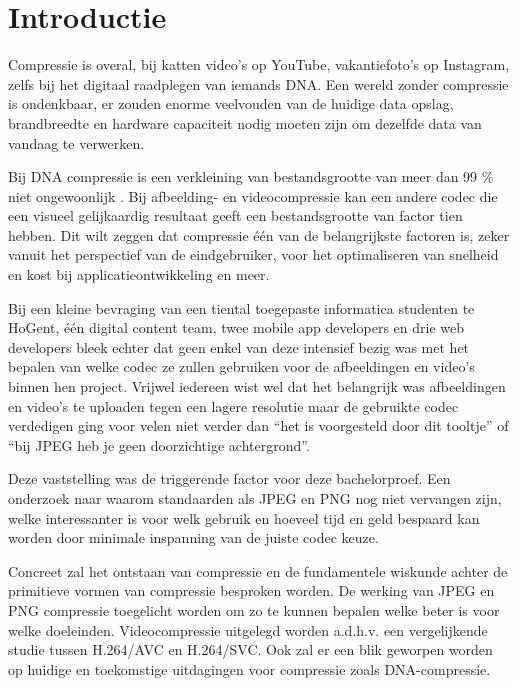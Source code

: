 
\section{Introductie} %
\label{sec:introductie}

Compressie is overal, bij katten video’s op YouTube, vakantiefoto’s op Instagram, zelfs bij het digitaal raadplegen van iemands DNA. Een wereld zonder compressie is ondenkbaar, er zouden enorme veelvouden van de huidige data opslag, brandbreedte en hardware capaciteit nodig moeten zijn om dezelfde data van vandaag te verwerken.

Bij DNA compressie is een verkleining van bestandsgrootte van meer dan 99 \% niet ongewoonlijk \autocite{Afify2011}. Bij afbeelding- en videocompressie kan een andere codec die een visueel gelijkaardig resultaat geeft een bestandsgrootte van factor tien hebben. Dit wilt zeggen dat compressie één van de belangrijkste factoren is, zeker vanuit het perspectief van de eindgebruiker, voor het optimaliseren van snelheid en kost bij applicatieontwikkeling en meer.

Bij een kleine bevraging van een tiental toegepaste informatica studenten te HoGent, één digital content team, twee mobile app developers en drie web developers bleek echter dat geen enkel van deze intensief bezig was met het bepalen van welke codec ze zullen gebruiken voor de afbeeldingen en video’s binnen hen project. Vrijwel iedereen wist wel dat het belangrijk was afbeeldingen en video’s te uploaden tegen een lagere resolutie maar de gebruikte codec verdedigen ging voor velen niet verder dan “het is voorgesteld door dit tooltje” of “bij JPEG heb je geen doorzichtige achtergrond”. 

Deze vaststelling was de triggerende factor voor deze bachelorproef. Een onderzoek naar waarom standaarden als JPEG en PNG nog niet vervangen zijn, welke interessanter is voor welk gebruik en hoeveel tijd en geld bespaard kan worden door minimale inspanning van de juiste codec keuze. 

Concreet zal het ontstaan van compressie en de fundamentele wiskunde achter de primitieve vormen van compressie besproken worden. De werking van JPEG en PNG compressie toegelicht worden om zo te kunnen bepalen welke beter is voor welke doeleinden. Videocompressie uitgelegd worden a.d.h.v. een vergelijkende studie tussen H.264/AVC en H.264/SVC. Ook zal er een blik geworpen worden op huidige en toekomstige uitdagingen voor compressie zoals DNA-compressie.

